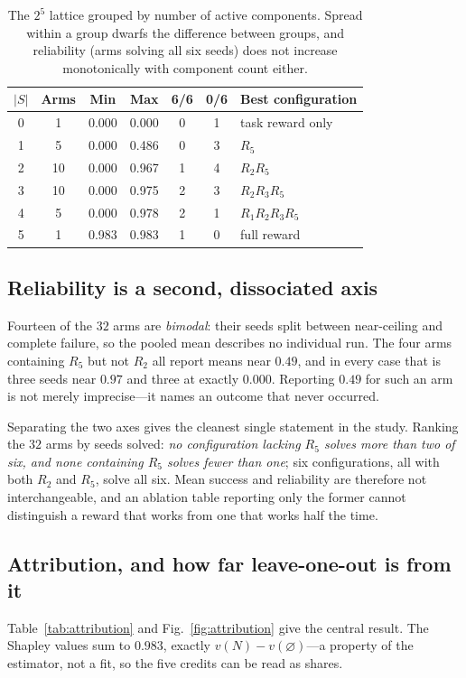 \documentclass[conference]{IEEEtran}
\begin{document}
\begin{table}[!t]
\centering
\caption{The $2^5$ lattice grouped by number of active components. Spread within
a group dwarfs the difference between groups, and reliability (arms solving all
six seeds) does not increase monotonically with component count either.}
\label{tab:bysize}
\small
\setlength{\tabcolsep}{4pt}
\begin{tabular}{ccccccl}
\toprule
$|S|$ & Arms & Min & Max & 6/6 & 0/6 & Best configuration \\
\midrule
0 & 1  & 0.000 & 0.000 & 0 & 1 & task reward only \\
1 & 5  & 0.000 & 0.486 & 0 & 3 & $R_5$ \\
2 & 10 & 0.000 & 0.967 & 1 & 4 & $R_2R_5$ \\
3 & 10 & 0.000 & 0.975 & 2 & 3 & $R_2R_3R_5$ \\
4 & 5  & 0.000 & 0.978 & 2 & 1 & $R_1R_2R_3R_5$ \\
5 & 1  & 0.983 & 0.983 & 1 & 0 & full reward \\
\bottomrule
\end{tabular}
\end{table}

\subsection{Reliability is a second, dissociated axis}
\label{sec:reliability}
Fourteen of the $32$ arms are \emph{bimodal}: their seeds split between
near-ceiling and complete failure, so the pooled mean describes no individual run.
The four arms containing $R_5$ but not $R_2$ all report means near $0.49$, and in
every case that is three seeds near $0.97$ and three at exactly $0.000$.
Reporting $0.49$ for such an arm is not merely imprecise---it names an outcome
that never occurred.

Separating the two axes gives the cleanest single statement in the study. Ranking
the $32$ arms by seeds solved: \emph{no configuration lacking $R_5$ solves more
than two of six, and none containing $R_5$ solves fewer than one}; six
configurations, all with both $R_2$ and $R_5$, solve all six. Mean success and
reliability are therefore not interchangeable, and an ablation table reporting
only the former cannot distinguish a reward that works from one that works half
the time.

\subsection{Attribution, and how far leave-one-out is from it}
Table~\ref{tab:attribution} and Fig.~\ref{fig:attribution} give the central
result. The Shapley values sum to $0.983$, exactly $v(N)-v(\varnothing)$---a
property of the estimator, not a fit, so the five credits can be read as shares.
\end{document}
